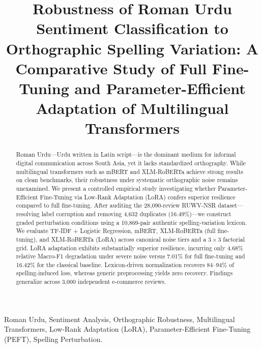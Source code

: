 \documentclass[conference]{IEEEtran}
\begin{document}
\title{Robustness of Roman Urdu Sentiment Classification to Orthographic Spelling Variation: A Comparative Study of Full Fine-Tuning and Parameter-Efficient Adaptation of Multilingual Transformers}

\author{
}

\maketitle

\begin{abstract}
Roman Urdu---Urdu written in Latin script---is the dominant medium for informal digital communication across South Asia, yet it lacks standardized orthography. While multilingual transformers such as mBERT and XLM-RoBERTa achieve strong results on clean benchmarks, their robustness under systematic orthographic noise remains unexamined. We present a controlled empirical study investigating whether Parameter-Efficient Fine-Tuning via Low-Rank Adaptation (LoRA) confers superior resilience compared to full fine-tuning. After auditing the 28,090-review RUWV-NSR dataset---resolving label corruption and removing 4,632 duplicates (16.49\%)---we construct graded perturbation conditions using a 10,869-pair authentic spelling-variation lexicon. We evaluate TF-IDF + Logistic Regression, mBERT, XLM-RoBERTa (full fine-tuning), and XLM-RoBERTa (LoRA) across canonical noise tiers and a $3 \times 3$ factorial grid. LoRA adaptation exhibits substantially superior resilience, incurring only 4.68\% relative Macro-F1 degradation under severe noise versus 7.01\% for full fine-tuning and 16.42\% for the classical baseline. Lexicon-driven normalization recovers 84--94\% of spelling-induced loss, whereas generic preprocessing yields zero recovery. Findings generalize across 3,000 independent e-commerce reviews.
\end{abstract}

\begin{IEEEkeywords}
Roman Urdu, Sentiment Analysis, Orthographic Robustness, Multilingual Transformers, Low-Rank Adaptation (LoRA), Parameter-Efficient Fine-Tuning (PEFT), Spelling Perturbation.
\end{IEEEkeywords}











\end{document}
